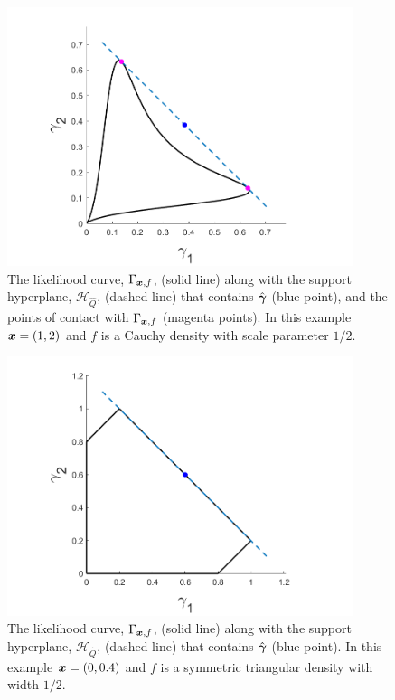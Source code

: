 	\begin{figure}
		\centering
		\includegraphics[width = 0.9\textwidth]{Figures/Mixtures/cauchy_support_hyperplane.png}
		\caption{The likelihood curve, $\Gamma_{{\bm{{x}}}, f}$, (solid line) along with the support hyperplane, $\mathcal{H}_{\hat{Q}}$, (dashed line) that contains $\hat{{\bm{{\gamma}}}}$ (blue point), and the points of contact with $\Gamma_{{\bm{{x}}}, f}$ (magenta points). In this example ${\bm{{x}}} = (1,2)$ and $f$ is a Cauchy density with scale parameter $1/2$.}
		\label{fig:cauchy support hyperplane}
	\end{figure}

	\begin{figure}
		\centering
		\includegraphics[width = 0.9\textwidth]{Figures/Mixtures/triangle_density_gamma.png}
		\caption{The likelihood curve, $\Gamma_{{\bm{{x}}}, f}$, (solid line) along with the support hyperplane, $\mathcal{H}_{\hat{Q}}$, (dashed line) that contains $\hat{{\bm{{\gamma}}}}$ (blue point). In this example ${\bm{{x}}} = (0,0.4)$ and $f$ is a symmetric triangular density with width $1/2$.}
		\label{fig:triangle support hyperplane}
	\end{figure}

